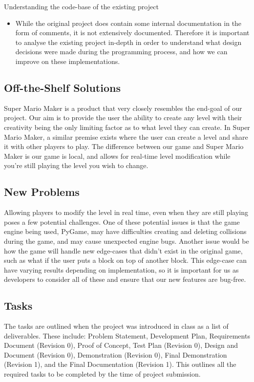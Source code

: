 \documentclass[12pt, titlepage]{article}
\begin{document}
Understanding the code-base of the existing project
\begin{itemize}
\item While the original project does contain some internal documentation in the form of comments, it is not extensively documented. Therefore it is important to analyse the existing project in-depth in order to understand what design decisions were made during the programming process, and how we can improve on these implementations.
\end{itemize}
\subsection{Off-the-Shelf Solutions}
Super Mario Maker is a product that very closely resembles the end-goal of our project. Our aim is to provide the user the ability to create any level with their creativity being the only limiting factor as to what level they can create. In Super Mario Maker, a similar premise exists where the user can create a level and share it with other players to play. The difference between our game and Super Mario Maker is our game is local, and allows for real-time level modification while you're still playing the level you wish to change.

\subsection{New Problems}
Allowing players to modify the level in real time, even when they are still playing poses a few potential challenges. One of these potential issues is that the game engine being used, PyGame, may have difficulties creating and deleting collisions during the game, and may cause unexpected engine bugs. Another issue would be how the game will handle new edge-cases that didn't exist in the original game, such as what if the user puts a block on top of another block. This edge-case can have varying results depending on implementation, so it is important for us as developers to consider all of these and ensure that our new features are bug-free. 

\subsection{Tasks}
The tasks are outlined when the project was introduced in class as a list of deliverables. These include: Problem Statement, Development Plan, Requirements Document (Revision 0), Proof of Concept, Test Plan (Revision 0), Design and Document (Revision 0), Demonstration (Revision 0), Final Demonstration (Revision 1), and the Final Documentation (Revision 1). This outlines all the required tasks to be completed by the time of project submission.
\end{document}
